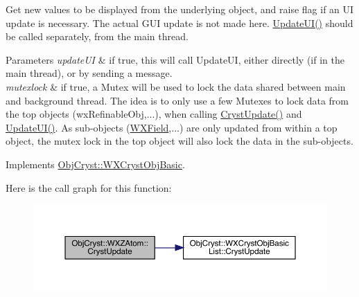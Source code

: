 Get new values to be displayed from the underlying object, and raise flag if an UI update is necessary. The actual G\+UI update is not made here. \mbox{\hyperlink{class_obj_cryst_1_1_w_x_z_atom_ad98ce4a82eb861cb2fafbddb7ab9bfbe}{Update\+U\+I()}} should be called separately, from the main thread.


\begin{DoxyParams}{Parameters}
{\em update\+UI} & if true, this will call Update\+UI, either directly (if in the main thread), or by sending a message. \\
\hline
{\em mutexlock} & if true, a Mutex will be used to lock the data shared between main and background thread. The idea is to only use a few Mutexes to lock data from the top objects (wx\+Refinable\+Obj,...), when calling \mbox{\hyperlink{class_obj_cryst_1_1_w_x_z_atom_af5872f558b7828759bbcd07a3a5aa53b}{Cryst\+Update()}} and \mbox{\hyperlink{class_obj_cryst_1_1_w_x_z_atom_ad98ce4a82eb861cb2fafbddb7ab9bfbe}{Update\+U\+I()}}. As sub-\/objects (\mbox{\hyperlink{class_obj_cryst_1_1_w_x_field}{W\+X\+Field}},...) are only updated from within a top object, the mutex lock in the top object will also lock the data in the sub-\/objects. \\
\hline
\end{DoxyParams}


Implements \mbox{\hyperlink{class_obj_cryst_1_1_w_x_cryst_obj_basic_a7ac00ae2ae28f1a6fa26e6fa571186b6}{Obj\+Cryst\+::\+W\+X\+Cryst\+Obj\+Basic}}.

Here is the call graph for this function\+:
\nopagebreak
\begin{figure}[H]
\begin{center}
\leavevmode
\includegraphics[width=350pt]{class_obj_cryst_1_1_w_x_z_atom_af5872f558b7828759bbcd07a3a5aa53b_cgraph}
\end{center}
\end{figure}
\mbox{\label{class_obj_cryst_1_1_w_x_z_atom_ad98ce4a82eb861cb2fafbddb7ab9bfbe}} 
